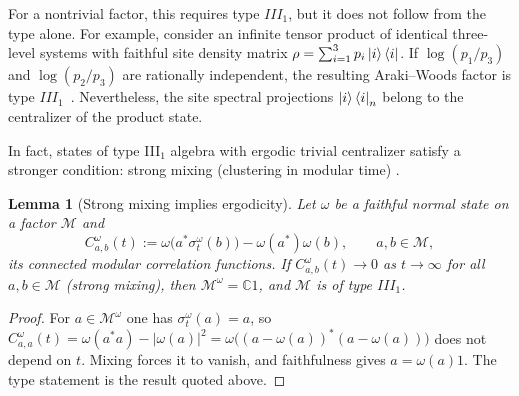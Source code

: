 \documentclass[a4paper,11pt]{article}
\newtheorem{lemma}[theorem]{Lemma}
\theoremstyle{definition}
\begin{document}
For a nontrivial factor, this requires type $III_1$, but it does not follow from the
type alone. For example, consider an infinite tensor product of identical three-level
systems with faithful site density matrix
$\rho=\sum_{i=1}^3p_i\ket{i}\bra{i}$.
If $\log(p_1/p_3)$ and $\log(p_2/p_3)$ are rationally independent, the resulting
Araki--Woods factor is type $III_1$~\cite{ArakiWoods1968}.
Nevertheless, the site spectral projections $\ket{i}\bra{i}_n$ belong to the
centralizer of the product state. 

In fact, states of type III$_1$ algebra with ergodic trivial centralizer satisfy a stronger condition: strong mixing (clustering in modular time) \cite{}.

\begin{lemma}[Strong mixing implies ergodicity]\label{lem:mixing-ergodic}
Let $\omega$ be a faithful normal state on a factor $\mathcal M$ and
\begin{equation}\label{eq:modular-correlation}
 C^\omega_{a,b}(t):=\omega\bigl(a^*\sigma^\omega_t(b)\bigr)-\omega(a^*)\omega(b),\qquad a,b\in\mathcal M,
\end{equation}
its connected modular correlation functions. If $C^\omega_{a,b}(t)\to0$ as $t\to\infty$ for all $a,b\in\mathcal M$ (strong mixing), then $\mathcal M^\omega=\mathbb C1$, and $\mathcal M$ is of type $III_1$.
\end{lemma}
\begin{proof}
For $a\in\mathcal M^\omega$ one has $\sigma^\omega_t(a)=a$, so $C^\omega_{a,a}(t)=\omega(a^*a)-|\omega(a)|^2=\omega\bigl((a-\omega(a))^*(a-\omega(a))\bigr)$ does not depend on $t$. Mixing forces it to vanish, and faithfulness gives $a=\omega(a)1$. The type statement is the result quoted above.
\end{proof}
\end{document}
